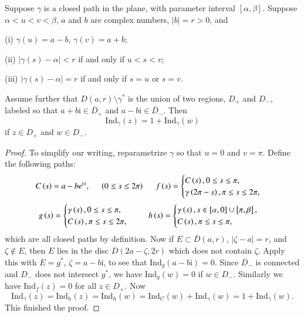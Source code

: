 \begin{theorem}
Suppose $\gamma$ is a closed path in the plane, with parameter interval $[\alpha,\beta]$. Suppose $\alpha<u<v<\beta$, $a$ and $b$ are complex numbers, $|b|=r>0$, and \par
(i) $\gamma(u)=a-b$, $\gamma(v)=a+b$;\par
(ii) $|\gamma(s)-\alpha|<r$ if and only if $u<s<v$;\par
(iii) $|\gamma(s)-\alpha|=r$ if and only if $s=u$ or $s=v$.\par
Assume further that $D(a,r)\setminus\gamma^*$ is the union of two regions, $D_+$ and $D_-$, labeled so that $a+b\mathrm{i}\in\overline{D}_+$ and $a-b\mathrm{i}\in\overline{D}_-$. Then 
$$\mathrm{Ind}_\gamma(z)=1+\mathrm{Ind}_\gamma(w)$$
if $z\in D_+$ and $w\in D_-$.
\end{theorem}
\begin{proof}
To simplify our writing, reparametrize $\gamma$ so that $u=0$ and $v=\pi$. Define the following paths: 
$$
C\left( s \right) =a-be^{\mathrm{i}s},\hspace{0.5cm}\left( 0\le s\le 2\pi \right) \hspace{0.5cm}f\left( s \right) =\begin{cases}
	C\left( s \right) ,0\le s\le \pi ,\\
	\gamma \left( 2\pi -s \right) ,\pi \le s\le 2\pi ,\\
\end{cases}
$$
$$
g\left( s \right) =\begin{cases}
	\gamma \left( s \right) ,0\le s\le \pi ,\\
	C\left( s \right) ,\pi \le s\le 2\pi ,\\
\end{cases}\hspace{0.5cm}h\left( s \right) =\begin{cases}
	\gamma \left( s \right) ,s\in \left[ \alpha ,0 \right] \cup \left[ \pi ,\beta \right] ,\\
	C\left( s \right) ,\pi \le s\le \pi ,\\
\end{cases}
$$
which are all closed paths by definition. Now if $E\subset\overline{D}(a,r)$, $|\zeta-a|=r$, and $\zeta\notin E$, then $E$ lies in the disc $D(2a-\zeta,2r)$ which does not contain $\zeta$. Apply this with $E=g^*$, $\zeta=a-b\mathrm{i}$, to see that $\mathrm{Ind}_g(a-b\mathrm{i})=0$. Since $\overline{D}_-$ is connected and $D_-$ does not intersect $g^*$, we have $\mathrm{Ind}_g(w)=0$ if $w\in D_-$. Similarly we have $\mathrm{Ind}_f(z)=0$ for all $z\in D_+$. Now 
$$
\mathrm{Ind}_{\gamma}\left( z \right) =\mathrm{Ind}_h\left( z \right) =\mathrm{Ind}_h\left( w \right) =\mathrm{Ind}_C\left( w \right) +\mathrm{Ind}_{\gamma}\left( w \right) =1+\mathrm{Ind}_{\gamma}\left( w \right) .
$$
This finished the proof.
\end{proof}
